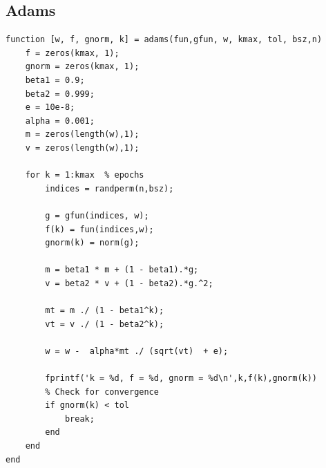 \documentclass[12pt]{article}%
\begin{document}
\subsection{Adams}\label{adams-code}
\begin{lstlisting}[style=Matlab-editor]
function [w, f, gnorm, k] = adams(fun,gfun, w, kmax, tol, bsz,n)
    f = zeros(kmax, 1);      
    gnorm = zeros(kmax, 1); 
    beta1 = 0.9;
    beta2 = 0.999; 
    e = 10e-8;
    alpha = 0.001;
    m = zeros(length(w),1);
    v = zeros(length(w),1);

    for k = 1:kmax  % epochs
        indices = randperm(n,bsz);
        
        g = gfun(indices, w);
        f(k) = fun(indices,w);
        gnorm(k) = norm(g);

        m = beta1 * m + (1 - beta1).*g;
        v = beta2 * v + (1 - beta2).*g.^2;

        mt = m ./ (1 - beta1^k);
        vt = v ./ (1 - beta2^k);
        
        w = w -  alpha*mt ./ (sqrt(vt)  + e);

        fprintf('k = %d, f = %d, gnorm = %d\n',k,f(k),gnorm(k))
        % Check for convergence
        if gnorm(k) < tol
            break;
        end
    end
end
\end{lstlisting}
\end{document}

